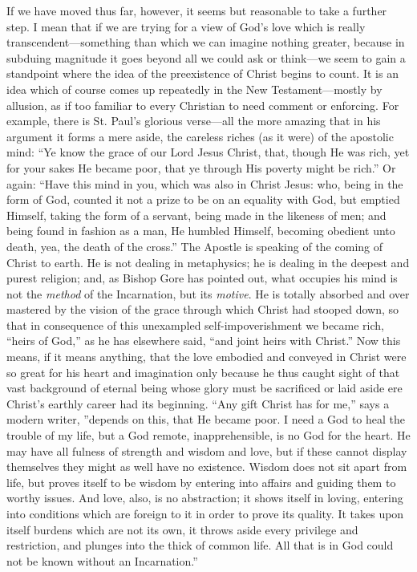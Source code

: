 \documentclass[12pt,a5paper,oneside]{book}
\begin{document}
If we have moved thus far, however, it seems
but reasonable to take a further step. I
mean that if we are trying for a view of God's
love which is really transcendent---something
than which we can imagine nothing greater,
because in subduing magnitude it goes beyond
all we could ask or think---we seem to gain
a standpoint where the idea of the preexistence
of Christ begins to count. It is an
idea which of course comes up repeatedly in
the New Testament---mostly by allusion, as
if too familiar to every Christian to need
comment or enforcing. For example, there is
St. Paul's glorious verse---all the more amazing
that in his argument it forms a mere aside,
the careless riches (as it were) of the apostolic
mind: ``Ye know the grace of our Lord Jesus
Christ, that, though He was rich, yet for your
sakes He became poor, that ye through His
poverty might be rich.'' Or again: ``Have
this mind in you, which was also in Christ
Jesus: who, being in the form of God, counted
it not a prize to be on an equality with God,
but emptied Himself, taking the form of a servant, 
being made in the likeness of men; and
being found in fashion as a man, He humbled
Himself, becoming obedient unto death, yea,
the death of the cross.'' The Apostle is speaking 
of the coming of Christ to earth. He is
not dealing in metaphysics; he is dealing in
the deepest and purest religion; and, as Bishop
Gore has pointed out, what occupies his mind
is not the \textit{method} of the Incarnation, but
its \textit{motive}. He is totally absorbed and over
mastered by the vision of the grace through
which Christ had stooped down, so that in
consequence of this unexampled self-impoverishment 
we became rich, ``heirs of God,'' as he
has elsewhere said, ``and joint heirs with
Christ.'' Now this means, if it means anything,
that the love embodied and conveyed in Christ
were so great for his heart and imagination
only because he thus caught sight of that
vast background of eternal being whose glory
must be sacrificed or laid aside ere Christ's
earthly career had its beginning. ``Any gift
Christ has for me,'' says a modern writer,
''depends on this, that He became poor. I
need a God to heal the trouble of my life,
but a God remote, inapprehensible, is no God
for the heart. He may have all fulness of
strength and wisdom and love, but if these
cannot display themselves they might as well
have no existence. Wisdom does not sit apart
from life, but proves itself to be wisdom by
entering into affairs and guiding them to worthy
issues. And love, also, is no abstraction;
it shows itself in loving, entering into conditions
which are foreign to it in order to prove its
quality. It takes upon itself burdens which
are not its own, it throws aside every privilege
and restriction, and plunges into the thick of
common life. All that is in God could not be
known without an Incarnation.''
\end{document}
